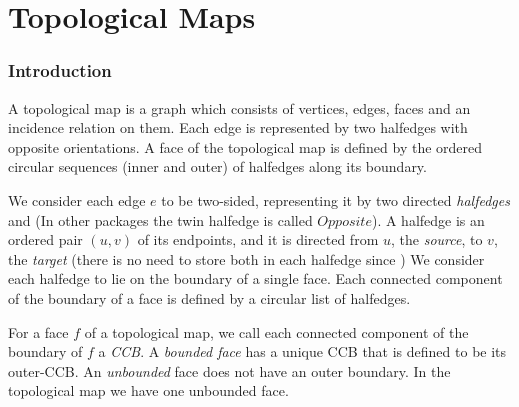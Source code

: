 
\def\Ipe#1{\def\IPEfile{#1}}


\chapter{Topological Maps}


\subsection*{Introduction}

A topological map is a graph which consists of vertices,
edges, faces and an incidence relation on them.
Each edge is represented by two halfedges with opposite orientations.
A face of the topological map is defined by the ordered
circular sequences 
(inner and outer) of halfedges along its boundary.

We consider each edge $e$ to be two-sided, representing it by two
directed {\em halfedges}  and 
(In other packages the twin halfedge is called $Opposite$).  
A halfedge  is an ordered pair $(u,v)$ of its endpoints, and
it is directed from $u$, the {\em source}, to $v$, the {\em target} (there 
is no need to store both in each halfedge since 
%
)
We consider each halfedge to lie on the boundary of a single face.
Each connected component of the boundary of a face is %
defined by a
circular list of halfedges. 

For a face $f$ of a topological map, 
we call each
connected component of the boundary of $f$ a {\em CCB}.
A {\em bounded face} has a
unique CCB that is defined to be
its outer-CCB. An
{\em unbounded} face does not have an outer boundary.
In the topological map we have one unbounded face.

